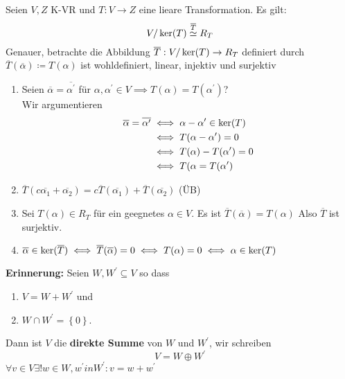 \begin{subtheorem}
	Seien $ V, Z $ K-VR und $ T: V \to Z $ eine lieare Transformation. Es gilt:
	\[
		V / \operatorname{ker}(T) \overset{\overline{T} }{\simeq} R_T
	\]
	Genauer, betrachte die Abbildung $ \overline{T} : V / \operatorname{ker}(T) \to R_T $ definiert durch $ \overline{T} (\overline{\alpha} ) \coloneqq T(\alpha) $ ist wohldefiniert, linear, injektiv und surjektiv
\end{subtheorem}
\begin{subproof*}
	\begin{enumerate}[label=(\roman*)]
		\item Seien $ \overline{\alpha} = \overline{\alpha^\prime }  $ für $ \alpha, \alpha^\prime \in V \implies T(\alpha)  = T(\alpha^\prime ) $?\\
			Wir argumentieren
			\begin{align*}
				\overline{\alpha} = \overline{\alpha^\prime }  &\iff \alpha - \alpha^\prime \in \operatorname{ker}(T) \\
					  &\iff T(\alpha - \alpha^\prime ) = 0 \\
					  &\iff T(\alpha) - T(\alpha^\prime ) = 0 \\
					  &\iff T(\alpha = T(\alpha^\prime )
			\end{align*}
		\item $ \overline{T} (c \overline{\alpha_1} + \overline{\alpha_2} ) = c \overline{T} (\overline{\alpha_1} )+ \overline{T} (\overline{\alpha_2} ) $ (ÜB)
		\item Sei $ T(\alpha) \in R_T $ für ein geegnetes $ \alpha \in V $. Es ist $ \overline{T} (\overline{\alpha} ) = T(\alpha) $ Also $ \overline{T}  $ ist surjektiv.
		\item $ \overline{\alpha} \in \operatorname{ker}(\overline{T} ) \iff \overline{T} (\overline{\alpha} ) = 0 \iff T(\alpha) = 0 \iff \alpha \in \operatorname{ker}(T) $
	\end{enumerate}
\end{subproof*}

\textbf{Erinnerung:} Seien $ W, W^\prime \subseteq V $ so dass
\begin{enumerate}[label=(\roman*)]
	\item $ V = W + W^\prime  $ und
	\item $ W \cap W^\prime = \left\{ 0 \right\}  $.
\end{enumerate}
Dann ist $ V $ die \textbf{direkte Summe} von $ W $ und $ W^\prime  $, wir schreiben
\[
	V = W \oplus W^\prime 
\]
$ \forall v \in V \exists ! w \in W, w^\prime in W^\prime : v = w + w^\prime  $



